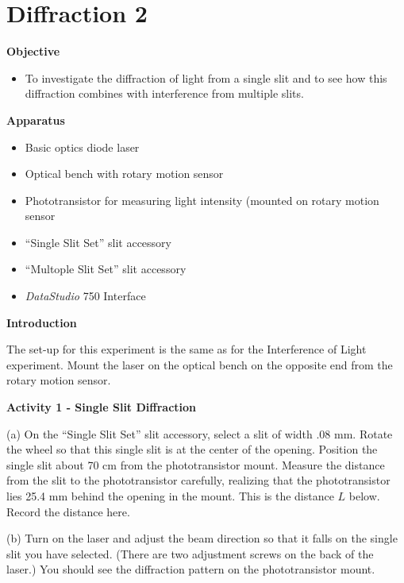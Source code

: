 \section{Diffraction 2}

\makelabheader %

\textbf{Objective}

\begin{itemize}
\item To investigate the diffraction of light from a single slit and to see how 
this diffraction combines with interference from multiple slits.
\end{itemize}

\textbf{Apparatus}

\begin{itemize}
\item Basic optics diode laser
\item Optical bench with rotary motion sensor
\item Phototransistor for measuring light intensity (mounted on rotary motion 
sensor
\item ``Single Slit Set'' slit accessory
\item ``Multople Slit Set'' slit accessory
\item {\it DataStudio} 750 Interface
\end{itemize}

\textbf{Introduction}

The set-up for this experiment is the same as for the Interference of Light 
experiment. Mount the laser on the optical bench on the opposite end from the 
rotary motion sensor. 

\textbf{Activity 1 - Single Slit Diffraction}

(a) On the ``Single Slit Set'' slit accessory, select a slit of width .08 mm. 
Rotate the wheel so that this single slit is at the center of the opening. 
Position the single slit about 70 cm from the phototransistor mount. Measure 
the distance from the slit to the phototransistor carefully, realizing that 
the phototransistor lies 25.4 mm behind the opening in the mount. This is the 
distance $L$ below. Record the distance here.
\vspace{10mm}

(b) Turn on the laser and adjust the beam direction so that it falls on the 
single slit you have selected. (There are two adjustment screws on the back 
of the laser.) You should see the diffraction pattern on the phototransistor 
mount.


